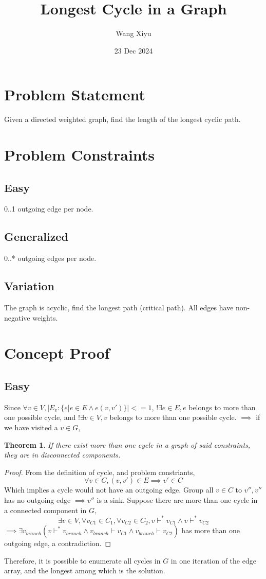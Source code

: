 \documentclass{article}
\newtheorem{theorem}{Theorem}[section]
\begin{document}
\title{Longest Cycle in a Graph}
\author{Wang Xiyu}
\date{23 Dec 2024}
\maketitle

\section*{Problem Statement}
Given a directed weighted graph, find the length of the longest cyclic path. 
\section*{Problem Constraints}
\subsection*{Easy}
0..1 outgoing edge per node.
\subsection*{Generalized}
0..* outgoing edges per node.
\subsection*{Variation}
The graph is acyclic, find the longest path (critical path). All edges have non-negative weights.
\section*{Concept Proof}
\subsection*{Easy}
Since $\forall v \in V, |E_v: \{e | e \in E \land e(v, v')\}| <= 1$, $!\exists e \in E, e$ 
belongs to more than one possible cycle, and $!\exists v \in V, v$ belongs to more than one possible cycle.
$\implies$ if we have visited a $v \in G$, 

\begin{theorem}
    If there exist more than one cycle in a graph of said constraints, they are in disconnected components.
\end{theorem}
\begin{proof}
    \indent From the definition of cycle, and problem constriants,
    \[\forall v \in C, (v, v') \in E \implies v' \in C\]
    Which implies a cycle would not have an outgoing edge. Group all $v \in C$ to $v'', v'' $ has no outgoing edge $\implies v'' $ is a sink.
    Suppose there are more than one cycle in a connected component in 
    $G, $
    \[\exists v\in V, \forall v_{C1} \in C_1, \forall v_{C2} \in C_2, v \vdash^* v_{C1} \land v \vdash^* v_{C2}\]
    $\implies \exists v_{branch}(v \vdash^* v_{branch} \land v_{branch} \vdash v_{C1} \land v_{branch} \vdash v_{C2})$ has more than one outgoing edge, a contradiction.
\end{proof}
\noindent Therefore, it is possible to enumerate all cycles in $G$ in one iteration of the edge array, and the longest among which is the solution.
\end{document}
